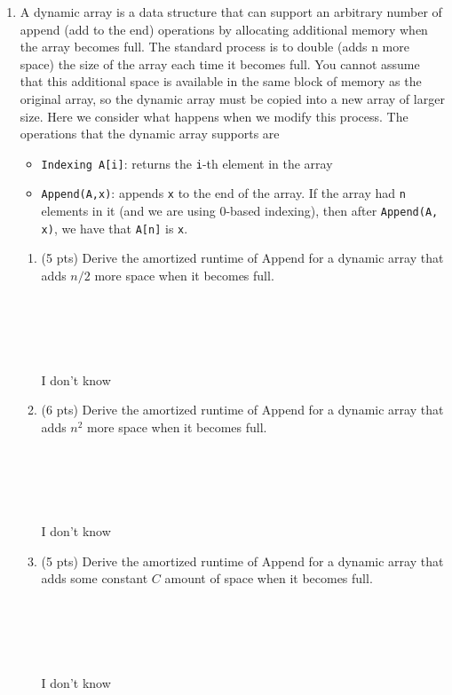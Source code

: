 \documentclass[12pt]{article}
\begin{document}
\begin{enumerate}
\item A dynamic array is a data structure that can support an arbitrary number
    of append (add to the end) operations by allocating additional memory when
    the array becomes full. The standard process is to double (adds n more
    space) the size of the array each time it becomes full. You cannot assume
    that this additional space is available in the same block of memory as the
    original array, so the dynamic array must be copied into a new array of
    larger size. Here we consider what happens when we modify this process. The
    operations that the dynamic array supports are 
\begin{itemize}
    \item {\tt Indexing A[i]}: returns the {\tt i}-th element in the array
    \item {\tt Append(A,x)}: appends {\tt x} to the end of the array.  If the
        array had {\tt n} elements in it (and we are using 0-based indexing),
        then after {\tt Append(A, x)}, we have that {\tt A[n]} is {\tt x}.
\end{itemize}

\begin{enumerate}
    \item \label{4a} (5 pts) Derive the amortized runtime of Append for a dynamic array that adds 
        $n/2$ more space when it becomes full.
    \\ \\ \\ \\ \\ \\ I don't know
    \pagebreak	
    \item \label{4b} (6 pts) Derive the amortized runtime of Append for a dynamic array that adds
        $n^2$ more space when it becomes full. 
    \\ \\ \\ \\ \\ \\ I don't know
    \pagebreak	
    \item \label{4c} (5 pts) Derive the amortized runtime of Append for a dynamic array that adds
        some constant $C$ amount of space when it becomes full.
    \\ \\ \\ \\ \\ \\ I don't know
    \pagebreak	
\end{enumerate}

\end{enumerate}
\end{document}
